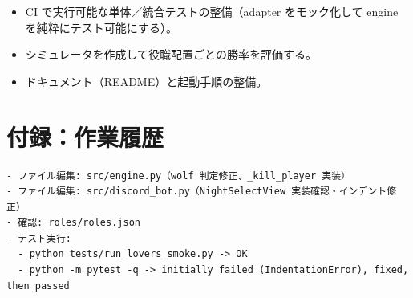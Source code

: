 \documentclass[12pt,a4paper]{article}
\begin{document}
\begin{itemize}
  \item CI で実行可能な単体／統合テストの整備（adapter をモック化して engine を純粋にテスト可能にする）。
  \item シミュレータを作成して役職配置ごとの勝率を評価する。
  \item ドキュメント（README）と起動手順の整備。
\end{itemize}

\section*{付録：作業履歴}

\begin{verbatim}
- ファイル編集: src/engine.py（wolf 判定修正、_kill_player 実装）
- ファイル編集: src/discord_bot.py（NightSelectView 実装確認・インデント修正）
- 確認: roles/roles.json
- テスト実行:
  - python tests/run_lovers_smoke.py -> OK
  - python -m pytest -q -> initially failed (IndentationError), fixed, then passed
\end{verbatim}
\end{document}
